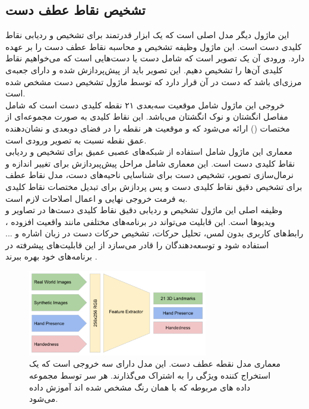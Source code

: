 \subsection{تشخیص نقاط عطف دست\protect{}}
این ماژول دیگر مدل اصلی است که یک ابزار قدرتمند برای تشخیص و ردیابی نقاط کلیدی دست است. این ماژول وظیفه تشخیص و محاسبه نقاط عطف دست را بر عهده دارد. ورودی آن یک تصویر است که شامل دست یا دست‌هایی 
است که می‌خواهیم نقاط کلیدی آن‌ها را تشخیص دهیم. این تصویر باید از پیش‌پردازش شده و دارای جعبه‌ی مرزی‌ای باشد که دست در آن قرار دارد که توسط ماژول تشخیص دست مشخص شده است.
\\
خروجی این ماژول شامل موقعیت سه‌بعدی ۲۱ نقطه کلیدی دست است که شامل مفاصل انگشتان و نوک انگشتان می‌باشد. این نقاط کلیدی به صورت مجموعه‌ای از مختصات () ارائه می‌شود 
که  و  موقعیت هر نقطه را در فضای دوبعدی و  نشان‌دهنده عمق نقطه نسبت به تصویر ورودی است.
\\
معماری این ماژول شامل استفاده از شبکه‌های عصبی عمیق برای تشخیص و ردیابی نقاط کلیدی دست است. این معماری شامل مراحل پیش‌پبردازش برای تغییر اندازه و نرمال‌سازی تصویر، تشخیص دست برای شناسایی ناحیه‌های دست، مدل 
نقاط عطف برای تشخیص دقیق نقاط کلیدی دست و پس‌ پردازش برای تبدیل مختصات نقاط کلیدی به فرمت خروجی نهایی و اعمال اصلاحات لازم است.
\\
وظیفه اصلی این ماژول تشخیص و ردیابی دقیق نقاط کلیدی دست‌ها در تصاویر و ویدیوها است. این قابلیت می‌تواند در برنامه‌های مختلفی مانند واقعیت افزوده ، رابط‌های کاربری بدون لمس،
تحلیل حرکات، تشخیص حرکات دست در زبان اشاره و ... استفاده شود و توسعه‌دهندگان را قادر می‌سازد از این قابلیت‌های پیشرفته در برنامه‌های خود بهره ببرند \cite{zhang2020mediapipe}.

\begin{figure}[h]
    \centering
    \includegraphics[width=0.7\textwidth]{landmark.png}
    \caption{معماری مدل نقطه عطف دست. این مدل دارای سه خروجی است که یک استخراج کننده ویژگی را به اشتراک می‌گذارند. هر سر توسط مجموعه داده های مربوطه که با همان رنگ مشخص شده اند آموزش داده می‌شود.}
\end{figure}

